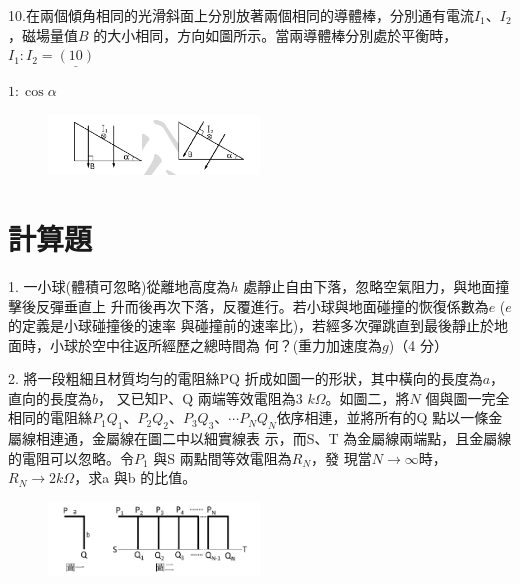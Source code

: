 \documentclass[cn,10pt,math=newtx,chinesefont=founder,device=ig]{elegantbook}
\begin{document}
\begin{example}
   10.在兩個傾角相同的光滑斜面上分別放著兩個相同的導體棒，分別通有電流$I_1、I_2$，磁場量值$B$
的大小相同，方向如圖所示。當兩導體棒分別處於平衡時，$I_1 : I_2 =\underline{(10)} $ \\
    \rightline{[全國聯招教甄109]}
\end{example}
\begin{solution}
    $1 : \cos{\alpha}$
\end{solution}
\begin{figure}[htbp]
    \flushright
    \includegraphics[width=0.5\textwidth]{image/109全國210.png}
  \end{figure}
\newpage

\section{計算題}


\begin{example}
  1. 一小球(體積可忽略)從離地高度為$h$ 處靜止自由下落，忽略空氣阻力，與地面撞擊後反彈垂直上
升而後再次下落，反覆進行。若小球與地面碰撞的恢復係數為$e$ ($e$的定義是小球碰撞後的速率
與碰撞前的速率比)，若經多次彈跳直到最後靜止於地面時，小球於空中往返所經歷之總時間為
何？(重力加速度為$g$)（4 分） \\
    \rightline{[全國聯招教甄109]}
\end{example}
\begin{solution}
    
\end{solution}

\newpage



\begin{example}
  2. 將一段粗細且材質均勻的電阻絲PQ 折成如圖一的形狀，其中橫向的長度為$a$，直向的長度為$b$，
又已知P、Q 兩端等效電阻為3 $k \Omega$。如圖二，將$N$ 個與圖一完全相同的電阻絲$P_1Q_1、P_2Q_2、
P_3Q_3、\cdots P_NQ_N$依序相連，並將所有的Q 點以一條金屬線相連通，金屬線在圖二中以細實線表
示，而S、T 為金屬線兩端點，且金屬線的電阻可以忽略。令$P_1$ 與S 兩點間等效電阻為$R_N$，發
現當$N\rightarrow \infty$時，$R_N\rightarrow 2 k\Omega$，求a 與b 的比值。 \\
    \rightline{[全國聯招教甄109]}
\end{example}
\begin{solution}
    
\end{solution}
\begin{figure}[htbp]
    \flushright
    \includegraphics[width=0.5\textwidth]{image/109全國32.png}
  \end{figure}
\newpage
\end{document}
